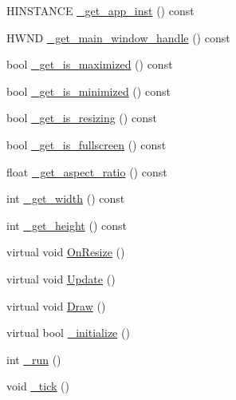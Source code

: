 \begin{DoxyCompactItemize}
H\+I\+N\+S\+T\+A\+N\+CE \hyperlink{classengine_a38a51558fe3e6a0edf5f762c921aa141_a38a51558fe3e6a0edf5f762c921aa141}{\+\_\+get\+\_\+app\+\_\+inst} () const 
\item 
H\+W\+ND \hyperlink{classengine_a12affafcff495e379ff19992c83ba15b_a12affafcff495e379ff19992c83ba15b}{\+\_\+get\+\_\+main\+\_\+window\+\_\+handle} () const 
\item 
bool \hyperlink{classengine_a3ee568cf7654c18533892a1c0c3eac5d_a3ee568cf7654c18533892a1c0c3eac5d}{\+\_\+get\+\_\+is\+\_\+maximized} () const 
\item 
bool \hyperlink{classengine_afb9d4d7b12c1325bdc3d5893b611b37d_afb9d4d7b12c1325bdc3d5893b611b37d}{\+\_\+get\+\_\+is\+\_\+minimized} () const 
\item 
bool \hyperlink{classengine_a2b29abf6edeaf9f4b95e121bbe1dae47_a2b29abf6edeaf9f4b95e121bbe1dae47}{\+\_\+get\+\_\+is\+\_\+resizing} () const 
\item 
bool \hyperlink{classengine_a2e3effd2671f53d5d995dca113bc7d23_a2e3effd2671f53d5d995dca113bc7d23}{\+\_\+get\+\_\+is\+\_\+fullscreen} () const 
\item 
float \hyperlink{classengine_ad86c3cbf7b32238e3220bf099d9f3f07_ad86c3cbf7b32238e3220bf099d9f3f07}{\+\_\+get\+\_\+aspect\+\_\+ratio} () const 
\item 
int \hyperlink{classengine_afd82949214a76015760ee848b13d2538_afd82949214a76015760ee848b13d2538}{\+\_\+get\+\_\+width} () const 
\item 
int \hyperlink{classengine_a4770b82e9574d43f2e34cecefbca4aa0_a4770b82e9574d43f2e34cecefbca4aa0}{\+\_\+get\+\_\+height} () const 
\item 
virtual void \hyperlink{classengine_aad7508d4c4c0c045e5335387422bf56d_aad7508d4c4c0c045e5335387422bf56d}{On\+Resize} ()
\item 
virtual void \hyperlink{classengine_abf295db7032f3acfe2cb81b5a418a196_abf295db7032f3acfe2cb81b5a418a196}{Update} ()
\item 
virtual void \hyperlink{classengine_ada832d0a14502f1b99fdbd5c72cab01b_ada832d0a14502f1b99fdbd5c72cab01b}{Draw} ()
\item 
virtual bool \hyperlink{classengine_a8b8dd82e72fd73e0601c30041529c4c0_a8b8dd82e72fd73e0601c30041529c4c0}{\+\_\+initialize} ()
\item 
int \hyperlink{classengine_a1d9b806d03be0255a8ac3c119e181cc5_a1d9b806d03be0255a8ac3c119e181cc5}{\+\_\+run} ()
\item 
void \hyperlink{classengine_a90418b124cd07d7d2f057e7d401ed641_a90418b124cd07d7d2f057e7d401ed641}{\+\_\+tick} ()

\end{DoxyCompactItemize}
